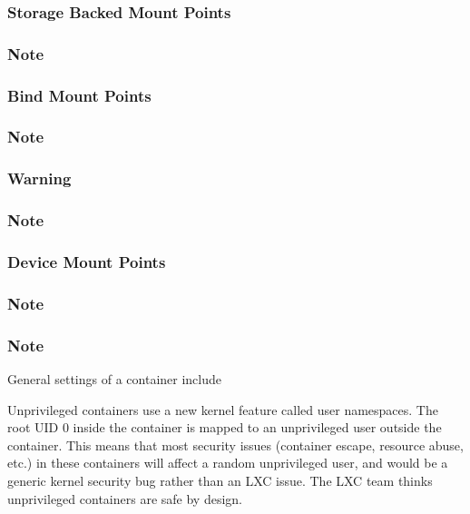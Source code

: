 \subsubsection{Storage Backed Mount Points}

\subsubsection{Note}

\subsubsection{Bind Mount Points}

\subsubsection{Note}

\subsubsection{Warning}

\subsubsection{Note}

\subsubsection{Device Mount Points}

\subsubsection{Note}

\subsubsection{Note}

General settings of a container include

Unprivileged containers use a new kernel feature called user namespaces. The root UID 0 inside the container is mapped to an unprivileged user outside the container. This means that most security issues (container escape, resource abuse, etc.) in these containers will affect a random unprivileged user, and would be a generic kernel security bug rather than an LXC issue. The LXC team thinks unprivileged containers are safe by design.

